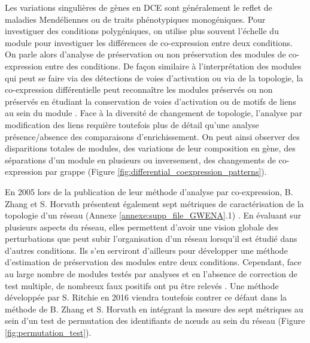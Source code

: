 Les variations singulières de gènes en DCE sont généralement le reflet de maladies Mendéliennes ou de traits phénotypiques monogéniques. Pour investiguer des conditions polygéniques, on utilise plus souvent l'échelle du module pour investiguer les différences de co-expression entre deux conditions. On parle alors d'analyse de préservation ou non préservation des modules de co-expression entre des conditions. De façon similaire à l'interprétation des modules qui peut se faire via des détections de voies d'activation ou via de la topologie, la co-expression différentielle peut reconnaître les modules préservés ou non préservés en étudiant la conservation de voies d'activation ou de motifs de liens au sein du module \cite{Chowdhury2019}. Face à la diversité de changement de topologie, l'analyse par modification des liens requière toutefois plus de détail qu'une analyse présence/absence des comparaisons d'enrichissement. On peut ainsi observer des disparitions totales de modules, des variations de leur composition en gène, des séparations d'un module en plusieurs ou inversement, des changements de co-expression par grappe (Figure \ref{fig:differential_coexpression_patterns}).

En 2005 lors de la publication de leur méthode d'analyse par co-expression, B. Zhang et S. Horvath présentent également sept métriques de caractérisation de la topologie d'un réseau (Annexe \ref{annexe:supp_file_GWENA}.1) \cite{Zhang2005a}. En évaluant sur plusieurs aspects du réseau, elles permettent d'avoir une vision globale des perturbations que peut subir l'organisation d'un réseau lorsqu'il est étudié dans d'autres conditions. Ils s'en serviront d'ailleurs pour développer une méthode d'estimation de préservation des modules entre deux conditions. Cependant, face au large nombre de modules testés par analyses et en l'absence de correction de test multiple, de nombreux faux positifs ont pu être relevés \cite{Ritchie2016}. Une méthode développée par S. Ritchie en 2016 viendra toutefois contrer ce défaut dans la méthode de B. Zhang et S. Horvath en intégrant la mesure des sept métriques au sein d'un test de permutation des identifiants de nœuds au sein du réseau (Figure \ref{fig:permutation_test}). 

